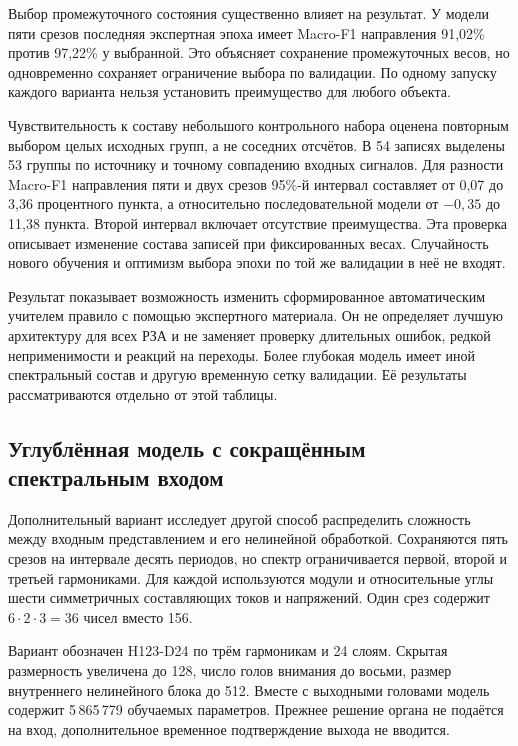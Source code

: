 Выбор промежуточного состояния существенно влияет на результат.
У модели пяти срезов последняя экспертная эпоха
имеет Macro-F1 направления 91,02\% против 97,22\%
у выбранной. Это объясняет сохранение промежуточных весов,
но одновременно сохраняет ограничение выбора по валидации.
По одному запуску каждого варианта
нельзя установить преимущество для любого объекта.

Чувствительность к составу небольшого контрольного набора
оценена повторным выбором целых исходных групп,
а не соседних отсчётов. В 54 записях выделены 53 группы
по источнику и точному совпадению входных сигналов.
Для разности Macro-F1 направления пяти и двух срезов
95\%-й интервал составляет от 0,07 до 3,36 процентного пункта,
а относительно последовательной модели
от $-0{,}35$ до 11,38 пункта.
Второй интервал включает отсутствие преимущества.
Эта проверка описывает изменение состава записей
при фиксированных весах. Случайность нового обучения
и оптимизм выбора эпохи по той же валидации
в неё не входят.

Результат показывает возможность изменить сформированное
автоматическим учителем правило с помощью экспертного материала.
Он не определяет лучшую архитектуру для всех РЗА
и не заменяет проверку длительных ошибок,
редкой неприменимости и реакций на переходы.
Более глубокая модель имеет иной спектральный состав
и другую временную сетку валидации.
Её результаты рассматриваются отдельно от этой таблицы.

\subsection{Углублённая модель с сокращённым спектральным входом}
\label{sec:ch5_h123_model}

Дополнительный вариант исследует другой способ
распределить сложность между входным представлением
и его нелинейной обработкой.
Сохраняются пять срезов на интервале десять периодов,
но спектр ограничивается первой, второй и третьей гармониками.
Для каждой используются модули и относительные углы
шести симметричных составляющих токов и напряжений.
Один срез содержит $6\cdot2\cdot3=36$ чисел вместо 156.

Вариант обозначен H123-D24 по трём гармоникам и 24 слоям.
Скрытая размерность увеличена до 128,
число голов внимания до восьми,
размер внутреннего нелинейного блока до 512.
Вместе с выходными головами модель содержит
5\,865\,779 обучаемых параметров.
Прежнее решение органа не подаётся на вход,
дополнительное временное подтверждение выхода не вводится.

